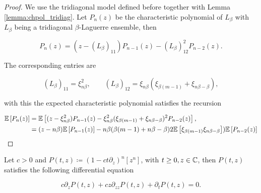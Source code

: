 \begin{proof}
    We use the tridiagonal model defined before together with Lemma \ref{lemma:chpol_tridiag}. Let $P_n(z)$ be the characteristic polynomial of $L_\beta$ with $L_\beta$ being a tridiagonal $\beta$-Laguerre ensemble, then

    \begin{equation*}
        P_n(z) = (z - (L_\beta)_{11})P_{n-1}(z) - (L_\beta)_{12}^2 P_{n-2}(z).
    \end{equation*}

    The corresponding entries are

    \begin{equation*}
        (L_\beta)_{11} = \xi^2_{n\beta}, \qquad (L_\beta)_{12} = \xi_{n\beta}(\xi_{\beta(m-1)} + \xi_{n\beta - \beta}),
    \end{equation*}

    \noindent with this the expected characteristic polynomial satisfies the recursion

    \begin{align*}
        \mathbb E \left[ P_n(z) \right] &= \mathbb E \left[  (z - \xi^2_{n\beta})P_{n-1}(z) - \xi^2_{n\beta}(\xi_{\beta(m-1)} + \xi_{n\beta - \beta})^2 P_{n-2}(z)  \right], \\ 
        &= (z - n\beta)\mathbb E \left[ P_{n-1}(z) \right] - n\beta(\beta(m-1) + n\beta- \beta)2\mathbb E \left[  \xi_{\beta(m-1)} \xi_{n\beta - \beta}  \right])\mathbb E \left[ P_{n-2}(z) \right]
    \end{align*}
\end{proof}

\begin{theorem}
    Let $c>0$ and $P(t,z) \coloneqq \left( 1 - ct\partial_z \right)^n [z^n]$, with $t\ge 0, z \in \mathbb C$, then $P(t,z)$ satisfies the following differential equation

    \begin{equation*} 
        c\partial_z P(t,z) + cz  \partial_{zz}P(t,z) + \partial_t P(t,z) = 0.
     \end{equation*}

\end{theorem}


